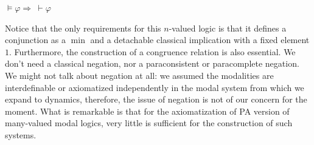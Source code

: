 \documentclass[paper=a4, fontsize=11pt]{scrartcl} %
\numberwithin{equation}{section} %
\numberwithin{figure}{section} %
\numberwithin{table}{section} %
\begin{document}
\begin{theorem}
    $\vDash \varphi \Rightarrow\ \vdash \varphi$
\end{theorem}
\begin{remark}
    Notice that the only requirements for this $n$-valued logic is that it defines a conjunction as a $\min$ and a detachable classical implication with a fixed element $1$. Furthermore, the construction of a congruence relation is also essential. We don't need a classical negation, nor a paraconsistent or paracomplete negation. We might not talk about negation at all: we assumed the modalities are interdefinable or axiomatized independently in the modal system from which we expand to dynamics, therefore, the issue of negation is not of our concern for the moment. What is remarkable is that for the axiomatization of PA version of many-valued modal logics, very little is sufficient for the construction of such systems. 
\end{remark}
\end{document}
